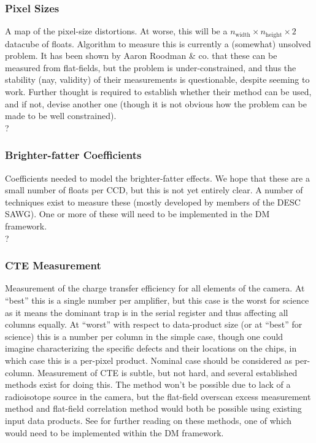 \subsubsection{Pixel Sizes }\label{calibProducts:pixelSizeMap}
A map of the pixel-size distortions.  At worse, this will be a $n_{\mbox{width}}\times n_{\mbox{height}}\times 2$ datacube of floats.
\alg Algorithm to measure this is currently a (somewhat) unsolved problem. It has been shown by Aaron Roodman \& co. that these can be measured from flat-fields, but the problem is under-constrained, and thus the stability (nay, validity) of their measurements is questionable, despite seeming to work. Further thought is required to establish whether their method can be used, and if not, devise another one (though it is not obvious how the problem can be made to be well constrained). 
\\ \dragons ?

\subsubsection{Brighter-fatter Coefficients}\label{calibProducts:brighterFatterCoeffs}
Coefficients needed to model the brighter-fatter effects. We hope that these are a small number of floats per CCD, but this is not yet entirely clear.
\alg A number of techniques exist to measure these (mostly developed by members of the DESC SAWG). One or more of these will need to be implemented in the DM framework.
\\ \dragons ?


\subsubsection{CTE Measurement}\label{calibProducts:CTE}
Measurement of the charge transfer efficiency for all elements of the camera. At ``best'' this is a single number per amplifier, but this case is the worst for science as it means the dominant trap is in the serial register and thus affecting all columns equally. At ``worst'' with respect to data-product size (or at ``best'' for science) this is a number per column in the simple case, though one could imagine characterizing the specific defects and their locations on the chips, in which case this is a per-pixel product. Nominal case should be considered as per-column.
\alg Measurement of CTE is subtle, but not hard, and several established methods exist for doing this. The \fefiftyfive method won't be possible due to lack of a radioisotope source in the camera, but the flat-field overscan excess measurement method and flat-field correlation method would both be possible using existing input data products. See \xxx for further reading on these methods, one of which would need to be implemented within the DM framework.

